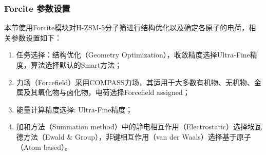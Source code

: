 \subsubsection{Forcite 参数设置}\label{Forcite 参数设置}
\par{本节使用Forcite模块对H-ZSM-5分子筛进行结构优化以及确定各原子的电荷，相关参数设置如下：}
\begin{enumerate}
    \item 任务选择：结构优化（Geometry Optimization），收敛精度选择Ultra-Fine精度，算法选择默认的Smart方法；
    \item 力场（Forcefield）采用COMPASS\uppercase\expandafter{}力场，其适用于大多数有机物、无机物、金属及其氧化物与卤化物，电荷选择Forcefield  assigned；
    \item 能量计算精度选择: Ultra-Fine精度；
    \item 加和方法（Summation method）中的静电相互作用（Electrostatic）选择埃瓦德方法（Ewald \& Group），非键相互作用（van der Waals）选择基于原子（Atom based）。
\end{enumerate}
